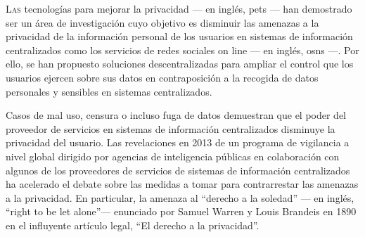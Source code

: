 


    
    {
    \lettrine{\textcolor[gray]{.25}{L}}{as} tecnologías para mejorar la privacidad 
    --- en inglés, \aclp*{pet} --- han demostrado ser un área de investigación cuyo 
    objetivo es disminuir las amenazas a la privacidad de la información personal 
    de los usuarios en sistemas de información centralizados como los servicios 
    de redes sociales on line --- en inglés, \aclp*{osn} ---. Por ello, se han propuesto 
    soluciones descentralizadas para ampliar el control que los usuarios ejercen 
    sobre sus datos en contraposición a la recogida de datos personales y sensibles 
    en sistemas centralizados.\par
    }
    
    Casos de mal uso, censura o incluso fuga de datos demuestran que el poder del 
    proveedor de servicios en sistemas de información centralizados disminuye la 
    privacidad del usuario. Las revelaciones en 2013 de un programa de vigilancia 
    a nivel global dirigido por agencias de inteligencia públicas en colaboración 
    con algunos de los proveedores de servicios de sistemas de información centralizados 
    ha acelerado el debate sobre las medidas a tomar para contrarrestar las amenazas 
    a la privacidad. En particular, la amenaza al ``derecho a la soledad'' --- en 
    inglés, ``right to be let alone''--- enunciado por Samuel Warren y Louis Brandeis 
    en 1890 en el influyente artículo legal, ``El derecho a la privacidad''.
    
